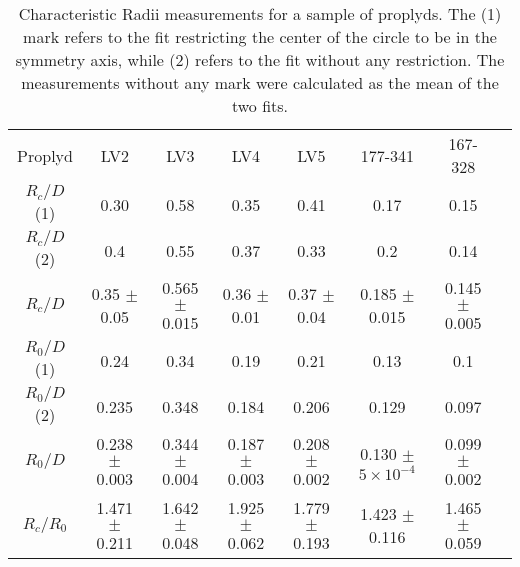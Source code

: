  \begin{table*}
\begin{tabular}{|c|c|c|c|c|c|c|c|}
Proplyd & LV2 & LV3 & LV4  & LV5 & 177-341 & 167-328 \\
$R_c/D$ (1) & 0.30 & 0.58  & 0.35 & 0.41 & 0.17 & 0.15 \\
$R_c/D$ (2) & 0.4 & 0.55 & 0.37 & 0.33 & 0.2 & 0.14    \\
$R_c/D$     & 0.35 $\pm$ 0.05 & 0.565 $\pm$ 0.015 & 0.36  $\pm$ 0.01  & 0.37 $\pm$ 0.04 & 0.185 $\pm$ 0.015 & 0.145 $\pm$ 0.005 \\
$R_0/D$ (1) & 0.24 & 0.34 & 0.19 & 0.21 & 0.13 & 0.1 \\
$R_0/D$ (2) & 0.235 & 0.348  & 0.184 & 0.206 & 0.129 & 0.097 \\
$R_0/D$     & 0.238 $\pm$ 0.003 & 0.344 $\pm$ 0.004 & 0.187 $\pm$ 0.003 & 0.208 $\pm$ 0.002 & 0.130 $\pm$ $5\times 10^{-4}$ & 0.099 $\pm$ 0.002 \\
$R_c/R_0$ & 1.471 $\pm$ 0.211 & 1.642 $\pm$ 0.048 & 1.925 $\pm$ 0.062 & 1.779 $\pm$ 0.193 & 1.423 $\pm$ 0.116 & 1.465 $\pm$ 0.059
\end{tabular}
\caption{Characteristic Radii measurements for a sample of proplyds. The (1) mark refers to the fit restricting
the center of the circle to be in the symmetry axis, while (2) refers to the fit without any restriction. The
measurements without any mark were calculated as the mean of the two
fits.}
\label{tab:proplyds}
\end{table*}

